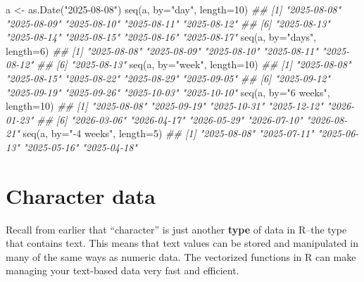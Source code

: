 \documentclass[
  13,
  letterpaper,
]{report}
\newenvironment{Shaded}{\begin{snugshade}}{\end{snugshade}}
\newcommand{\AttributeTok}[1]{\textcolor[rgb]{0.40,0.45,0.13}{#1}}
\newcommand{\DecValTok}[1]{\textcolor[rgb]{0.68,0.00,0.00}{#1}}
\newcommand{\DocumentationTok}[1]{\textcolor[rgb]{0.37,0.37,0.37}{\textit{#1}}}
\newcommand{\FunctionTok}[1]{\textcolor[rgb]{0.28,0.35,0.67}{#1}}
\newcommand{\NormalTok}[1]{\textcolor[rgb]{0.00,0.23,0.31}{#1}}
\newcommand{\OtherTok}[1]{\textcolor[rgb]{0.00,0.23,0.31}{#1}}
\newcommand{\StringTok}[1]{\textcolor[rgb]{0.13,0.47,0.30}{#1}}
\begin{document}
\begin{Shaded}
\begin{Highlighting}[]

\NormalTok{a }\OtherTok{\textless{}{-}} \FunctionTok{as.Date}\NormalTok{(}\StringTok{"2025{-}08{-}08"}\NormalTok{)}
\FunctionTok{seq}\NormalTok{(a, }\AttributeTok{by=}\StringTok{"day"}\NormalTok{, }\AttributeTok{length=}\DecValTok{10}\NormalTok{)}
\DocumentationTok{\#\#  [1] "2025{-}08{-}08" "2025{-}08{-}09" "2025{-}08{-}10" "2025{-}08{-}11" "2025{-}08{-}12"}
\DocumentationTok{\#\#  [6] "2025{-}08{-}13" "2025{-}08{-}14" "2025{-}08{-}15" "2025{-}08{-}16" "2025{-}08{-}17"}
\FunctionTok{seq}\NormalTok{(a, }\AttributeTok{by=}\StringTok{"days"}\NormalTok{, }\AttributeTok{length=}\DecValTok{6}\NormalTok{)}
\DocumentationTok{\#\# [1] "2025{-}08{-}08" "2025{-}08{-}09" "2025{-}08{-}10" "2025{-}08{-}11" "2025{-}08{-}12"}
\DocumentationTok{\#\# [6] "2025{-}08{-}13"}
\FunctionTok{seq}\NormalTok{(a, }\AttributeTok{by=}\StringTok{"week"}\NormalTok{, }\AttributeTok{length=}\DecValTok{10}\NormalTok{)}
\DocumentationTok{\#\#  [1] "2025{-}08{-}08" "2025{-}08{-}15" "2025{-}08{-}22" "2025{-}08{-}29" "2025{-}09{-}05"}
\DocumentationTok{\#\#  [6] "2025{-}09{-}12" "2025{-}09{-}19" "2025{-}09{-}26" "2025{-}10{-}03" "2025{-}10{-}10"}
\FunctionTok{seq}\NormalTok{(a, }\AttributeTok{by=}\StringTok{"6 weeks"}\NormalTok{, }\AttributeTok{length=}\DecValTok{10}\NormalTok{)}
\DocumentationTok{\#\#  [1] "2025{-}08{-}08" "2025{-}09{-}19" "2025{-}10{-}31" "2025{-}12{-}12" "2026{-}01{-}23"}
\DocumentationTok{\#\#  [6] "2026{-}03{-}06" "2026{-}04{-}17" "2026{-}05{-}29" "2026{-}07{-}10" "2026{-}08{-}21"}
\FunctionTok{seq}\NormalTok{(a, }\AttributeTok{by=}\StringTok{"{-}4 weeks"}\NormalTok{, }\AttributeTok{length=}\DecValTok{5}\NormalTok{)}
\DocumentationTok{\#\# [1] "2025{-}08{-}08" "2025{-}07{-}11" "2025{-}06{-}13" "2025{-}05{-}16" "2025{-}04{-}18"}
\end{Highlighting}
\end{Shaded}

\section{Character data}\label{sec-manip-char}

Recall from earlier that ``character'' is just another \textbf{type} of
data in R--the type that contains text. This means that text values can
be stored and manipulated in many of the same ways as numeric data. The
vectorized functions in R can make managing your text-based data very
fast and efficient.
\end{document}
